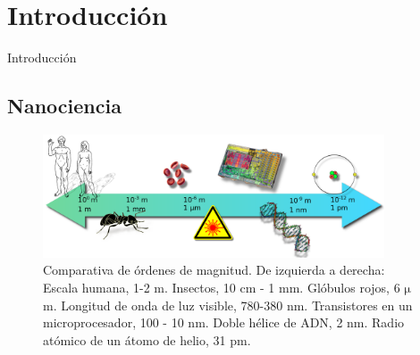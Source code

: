 \documentclass[aspectratio=169]{beamer}
\begin{document}
	\section{Introducción}
	\begin{frame}{Introducción}
		\subsection{Nanociencia}
		\begin{figure}[h!]
			\centering
			\includegraphics[width=0.9\textwidth]{scale.pdf}
			\caption[Comparativa de ódenes de magnitud desde metros hasta picometros]{Comparativa de órdenes de magnitud. De izquierda a derecha: Escala humana, 1-2 m. Insectos, 10 cm - 1 mm. Glóbulos rojos, 6 $\mathrm{\mu}$m. Longitud de onda de luz visible, 780-380 nm. Transistores en un microprocesador, 100 - 10 nm. Doble hélice de ADN, 2 nm. Radio atómico de un átomo de helio, 31 pm.}
			\label{fig:scale}
		\end{figure}
	\end{frame}
\end{document}
